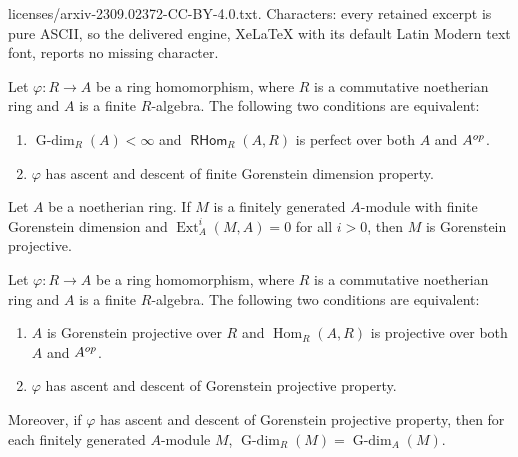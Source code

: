\documentclass[10pt,a4paper]{amsart}
\DeclareMathOperator{\Ext}{Ext}
\DeclareMathOperator{\Gdim}{G-dim}
\DeclareMathOperator{\Hom}{Hom}
\DeclareMathOperator{\RHom}{\mathsf{RHom}}
\begin{document}
licenses/arxiv-2309.02372-CC-BY-4.0.txt. Characters: every retained excerpt is pure ASCII, so the delivered engine, XeLaTeX with its default Latin Modern text font, reports no missing character.
\begin{theorem}\label{observation}
Let $\varphi\colon R\rightarrow A$ be a ring homomorphism, where $R$ is a commutative noetherian ring and $A$ is a finite $R$-algebra.
The following two conditions are equivalent$\colon$
\begin{enumerate}
\item\label{basic}  $\Gdim_R(A)<\infty$ and $\RHom_R(A,R)$ is perfect over both $A$ and $A^{\rm op}$.

\item\label{TF} $\varphi$ has ascent and descent of finite Gorenstein dimension property.
\end{enumerate}
\end{theorem}

\begin{lemma}\label{TFtest}
Let $A$ be a noetherian ring. If $M$ is a finitely generated  $A$-module with finite Gorenstein dimension and $\Ext^i_A(M,A)=0$ for all $i>0$, then $M$ is Gorenstein projective.
\end{lemma}

\begin{theorem}\label{ADTF}
Let $\varphi\colon R\rightarrow A$ be a ring homomorphism, where $R$ is a commutative noetherian ring and $A$ is a finite $R$-algebra.
The following two conditions are equivalent$\colon$
\begin{enumerate}
\item  $A$ is Gorenstein projective over $R$ and $\Hom_R(A,R)$ is projective over both $A$ and $A^{\rm op}$.

\item $\varphi$ has ascent and descent of Gorenstein projective property.
\end{enumerate}
Moreover, if $\varphi$ has ascent and descent of Gorenstein projective property, then for each finitely generated $A$-module $M$, $\Gdim_R(M)=\Gdim_A(M)$.
\end{theorem}
\end{document}
